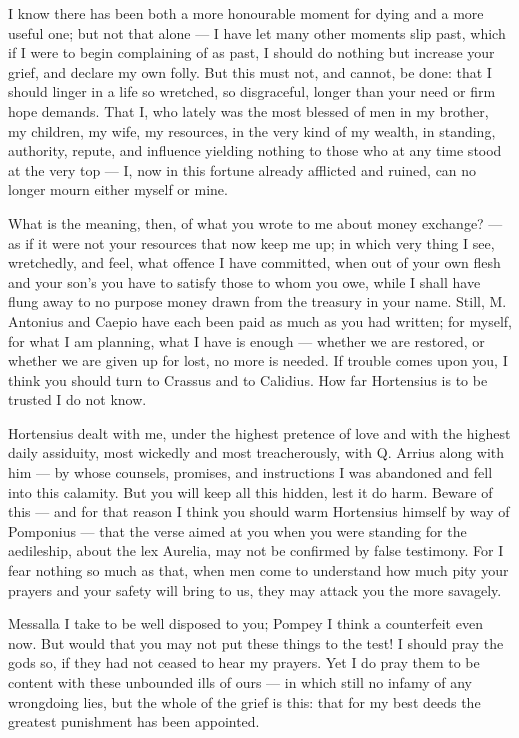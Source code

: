 I know there has been both a more honourable moment for dying and a more useful one; but not that alone --- I have let many other moments slip past, which if I were to begin complaining of as past, I should do nothing but increase your grief, and declare my own folly. But this must not, and cannot, be done: that I should linger in a life so wretched, so disgraceful, longer than your need or firm hope demands. That I, who lately was the most blessed of men in my brother, my children, my wife, my resources, in the very kind of my wealth, in standing, authority, repute, and influence yielding nothing to those who at any time stood at the very top --- I, now in this fortune already afflicted and ruined, can no longer mourn either myself or mine.

 What is the meaning, then, of what you wrote to me about money exchange? --- as if it were not your resources that now keep me up; in which very thing I see, wretchedly, and feel, what offence I have committed, when out of your own flesh and your son's you have to satisfy those to whom you owe, while I shall have flung away to no purpose money drawn from the treasury in your name. Still, M. Antonius and Caepio have each been paid as much as you had written; for myself, for what I am planning, what I have is enough --- whether we are restored, or whether we are given up for lost, no more is needed. If trouble comes upon you, I think you should turn to Crassus and to Calidius. How far Hortensius is to be trusted I do not know.

 Hortensius dealt with me, under the highest pretence of love and with the highest daily assiduity, most wickedly and most treacherously, with Q. Arrius along with him --- by whose counsels, promises, and instructions I was abandoned and fell into this calamity. But you will keep all this hidden, lest it do harm. Beware of this --- and for that reason I think you should warm Hortensius himself by way of Pomponius --- that the verse aimed at you when you were standing for the aedileship, about the lex Aurelia, may not be confirmed by false testimony. For I fear nothing so much as that, when men come to understand how much pity your prayers and your safety will bring to us, they may attack you the more savagely.

 Messalla I take to be well disposed to you; Pompey I think a counterfeit even now. But would that you may not put these things to the test! I should pray the gods so, if they had not ceased to hear my prayers. Yet I do pray them to be content with these unbounded ills of ours --- in which still no infamy of any wrongdoing lies, but the whole of the grief is this: that for my best deeds the greatest punishment has been appointed.

